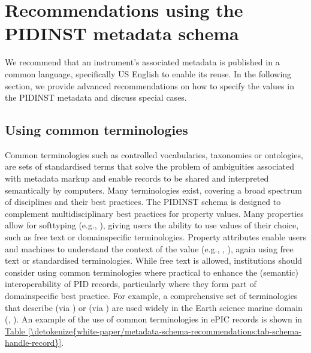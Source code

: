 \documentclass[a4paper,10pt,english]{sphinxmanual}
\begin{document}
\section{Recommendations using the PIDINST metadata schema}
\label{\detokenize{white-paper/metadata-schema-recommendations:recommendations-using-the-pidinst-metadata-schema}}\label{\detokenize{white-paper/metadata-schema-recommendations:pidinst-metadata-schema-recommendations}}\label{\detokenize{white-paper/metadata-schema-recommendations::doc}}
\sphinxAtStartPar
We recommend that an instrument’s associated metadata is published in
a common language, specifically US English to enable its reuse.  In
the following section, we provide advanced recommendations on how to
specify the values in the PIDINST metadata and discuss special cases.


\subsection{Using common terminologies}
\label{\detokenize{white-paper/metadata-schema-recommendations:using-common-terminologies}}\label{\detokenize{white-paper/metadata-schema-recommendations:pidinst-metadata-schema-terminologies}}
\sphinxAtStartPar
Common terminologies such as controlled vocabularies, taxonomies or
ontologies, are sets of standardised terms that solve the problem of
ambiguities associated with metadata markup and enable records to be
shared and interpreted semantically by computers.  Many terminologies
exist, covering a broad spectrum of disciplines and their best
practices.  The PIDINST schema is designed to complement
multidisciplinary best practices for property values.  Many properties
allow for soft\sphinxhyphen{}typing (e.g., ), giving users the ability to
use values of their choice, such as free text or domain\sphinxhyphen{}specific
terminologies.  Property attributes enable users and machines to
understand the context of the value (e.g., ,
), again using free text or standardised
terminologies.  While free text is allowed, institutions should
consider using common terminologies where practical to enhance the
(semantic) interoperability of PID records, particularly where they
form part of domain\sphinxhyphen{}specific best practice.  For example, a
comprehensive set of terminologies that describe  (via
) or  (via ) are
used widely in the Earth science marine domain
(,
).
An example of the use of common terminologies in ePIC records is shown
in \hyperref[\detokenize{white-paper/metadata-schema-recommendations:tab-schema-handle-record}]{Table \ref{\detokenize{white-paper/metadata-schema-recommendations:tab-schema-handle-record}}}.
\end{document}
